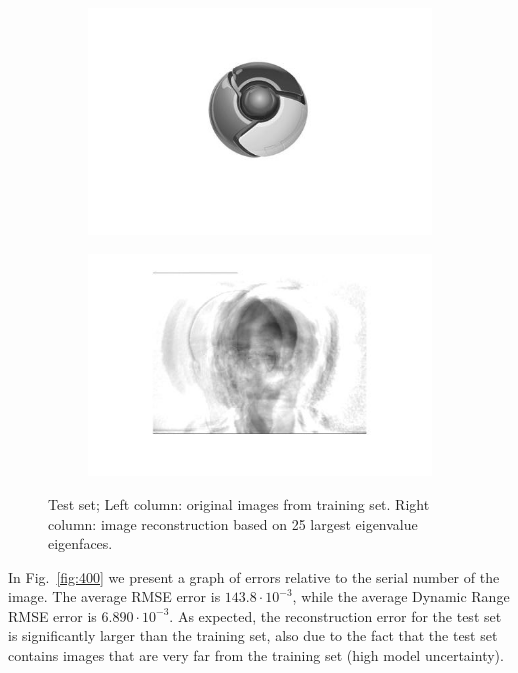 \documentclass[a4paper]{iacas}
\begin{document}
\begin{figure}[!htbp]
	\begin{subfigure}[b]{0.4\textwidth}
		\includegraphics[width=\textwidth]{4012.jpg}
		\caption{}
		\label{fig:4012}
	\end{subfigure}
	\begin{subfigure}[b]{0.4\textwidth}
		\includegraphics[width=\textwidth]{4011.jpg}
		\caption{}
		\label{fig:4011}
	\end{subfigure}
	
	\caption{Test set; Left column: original images from training set. Right column: image reconstruction based on 25 largest eigenvalue eigenfaces.}
	\label{fig:4000}
\end{figure}

In Fig.~\ref{fig:400} we present a graph of errors relative to the serial number of the image. The average RMSE error is $143.8 \cdot 10^{-3}$, while the average Dynamic Range RMSE error is $6.890 \cdot 10^{-3}$. As expected, the reconstruction error for the test set is significantly larger than the training set, also due to the fact that the test set contains images that are very far from the training set (high model uncertainty).
\end{document}
